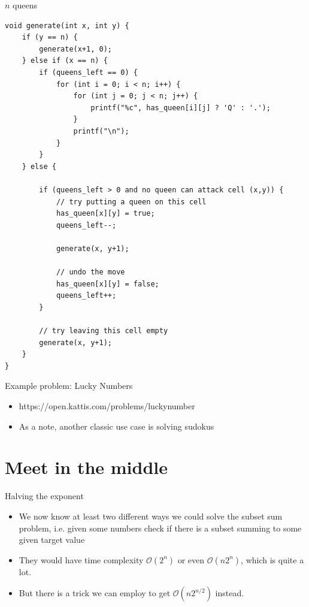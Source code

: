 \documentclass{beamer}
\begin{document}
\begin{frame}{$n$ queens}
    \begin{verbatim}
void generate(int x, int y) {
    if (y == n) {
        generate(x+1, 0);
    } else if (x == n) {
        if (queens_left == 0) {
            for (int i = 0; i < n; i++) {
                for (int j = 0; j < n; j++) {
                    printf("%c", has_queen[i][j] ? 'Q' : '.');
                }
                printf("\n");
            }
        }
    } else {

        if (queens_left > 0 and no queen can attack cell (x,y)) {
            // try putting a queen on this cell
            has_queen[x][y] = true;
            queens_left--;

            generate(x, y+1);

            // undo the move
            has_queen[x][y] = false;
            queens_left++;
        }

        // try leaving this cell empty
        generate(x, y+1);
    }
}
    \end{verbatim}
\end{frame}

\begin{frame}[plain]{Example problem: Lucky Numbers}
    \begin{itemize}
        \item https://open.kattis.com/problems/luckynumber
        \item As a note, another classic use case is solving sudokus
    \end{itemize}
\end{frame}

\section*{Meet in the middle}

\begin{frame}{Halving the exponent}
    \begin{itemize}
        \item We now know at least two different ways we could solve the subset sum problem, i.e. given some numbers check if there is a subset summing to some given target value
        \item They would have time complexity $\mathcal{O}(2^n)$ or even $\mathcal{O}(n2^n)$, which is quite a lot.
        \item But there is a trick we can employ to get $\mathcal{O}(n2^{n/2})$ instead.
    \end{itemize}
\end{frame}
\end{document}
